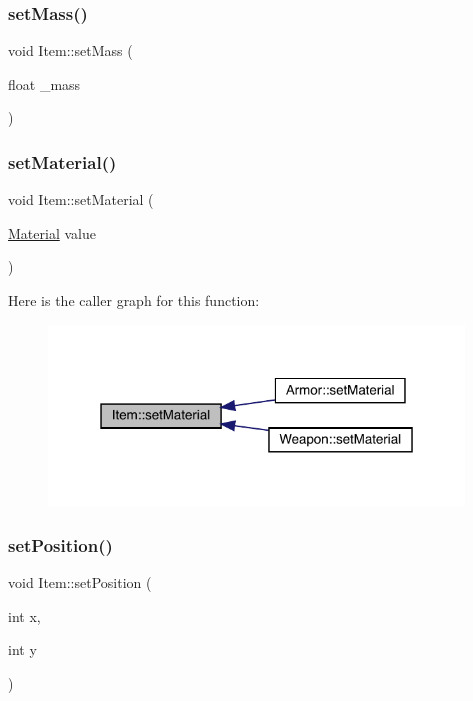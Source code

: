 \subsubsection{\texorpdfstring{set\+Mass()}{setMass()}}
{\footnotesize\ttfamily void Item\+::set\+Mass (\begin{DoxyParamCaption}\item[{float}]{\+\_\+mass }\end{DoxyParamCaption})}

\mbox{\label{class_item_af8f9e1899f933fc2ae2cdee6c7de0a4e}} 
\subsubsection{\texorpdfstring{set\+Material()}{setMaterial()}}
{\footnotesize\ttfamily void Item\+::set\+Material (\begin{DoxyParamCaption}\item[{\mbox{\hyperlink{class_material}{Material}}}]{value }\end{DoxyParamCaption})}

Here is the caller graph for this function\+:
\nopagebreak
\begin{figure}[H]
\begin{center}
\leavevmode
\includegraphics[width=313pt]{dc/d32/class_item_af8f9e1899f933fc2ae2cdee6c7de0a4e_icgraph}
\end{center}
\end{figure}
\mbox{\label{class_item_af8f03acf491fb71ec8cf1e4248bb4b3d}} 
\subsubsection{\texorpdfstring{set\+Position()}{setPosition()}}
{\footnotesize\ttfamily void Item\+::set\+Position (\begin{DoxyParamCaption}\item[{int}]{x,  }\item[{int}]{y }\end{DoxyParamCaption})}

